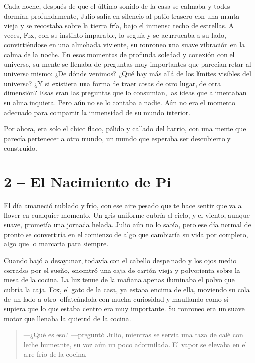\documentclass[a4paper,12pt]{book}
\begin{document}
Cada noche, después de que el último sonido de la casa se calmaba y todos dormían profundamente, Julio salía en silencio al patio trasero con una manta vieja y se recostaba sobre la tierra fría, bajo el inmenso techo de estrellas. A veces, Fox, con su instinto imparable, lo seguía y se acurrucaba a su lado, convirtiéndose en una almohada viviente, su ronroneo una suave vibración en la calma de la noche. En esos momentos de profunda soledad y conexión con el universo, su mente se llenaba de preguntas muy importantes que parecían retar al universo mismo: ¿De dónde venimos? ¿Qué hay más allá de los límites visibles del universo? ¿Y si existiera una forma de traer cosas de otro lugar, de otra dimensión? Esas eran las preguntas que lo consumían, las ideas que alimentaban su alma inquieta. Pero aún no se lo contaba a nadie. Aún no era el momento adecuado para compartir la inmensidad de su mundo interior.

Por ahora, era solo el chico flaco, pálido y callado del barrio, con una mente que parecía pertenecer a otro mundo, un mundo que esperaba ser descubierto y construido.

\cleardoublepage %

\chapter*{2 – El Nacimiento de Pi}

El día amaneció nublado y frío, con ese aire pesado que te hace sentir que va a llover en cualquier momento. Un gris uniforme cubría el cielo, y el viento, aunque suave, prometía una jornada helada. Julio aún no lo sabía, pero ese día normal de pronto se convertiría en el comienzo de algo que cambiaría su vida por completo, algo que lo marcaría para siempre.

Cuando bajó a desayunar, todavía con el cabello despeinado y los ojos medio cerrados por el sueño, encontró una caja de cartón vieja y polvorienta sobre la mesa de la cocina. La luz tenue de la mañana apenas iluminaba el polvo que cubría la caja. Fox, el gato de la casa, ya estaba encima de ella, moviendo su cola de un lado a otro, olfateándola con mucha curiosidad y maullando como si supiera que lo que estaba dentro era muy importante. Su ronroneo era un suave motor que llenaba la quietud de la cocina.

\begin{quote}
    —¿Qué es eso? —preguntó Julio, mientras se servía una taza de café con leche humeante, su voz aún un poco adormilada. El vapor se elevaba en el aire frío de la cocina.
\end{quote}
\end{document}
